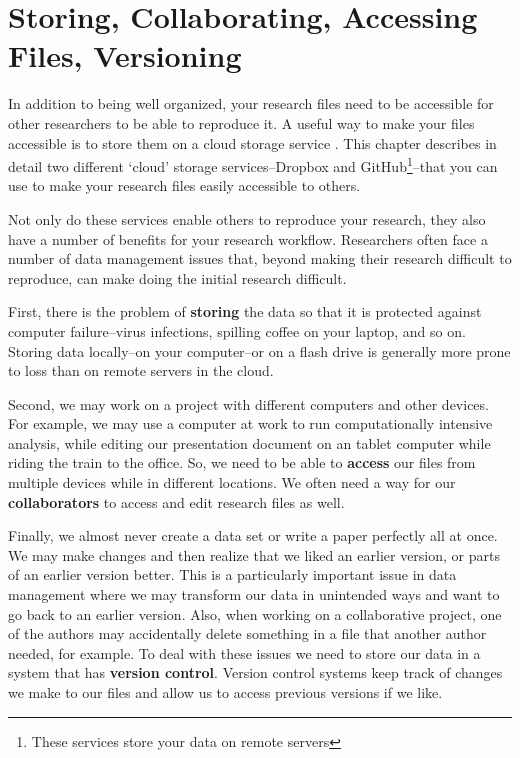 



\chapter{Storing, Collaborating, Accessing Files, Versioning}\label{Storing}

In addition to being well organized, your research files need to be accessible for other researchers to be able to reproduce it. A useful way to make your files accessible is to store them on a cloud storage service \cite[see][]{Howe2012}. This chapter describes in detail two different `cloud' storage services--Dropbox and GitHub\footnote{These services store your data on remote servers}--that you can use to make your research files easily accessible to others.

Not only do these services enable others to reproduce your research, they also have a number of benefits for your research workflow. Researchers often face a number of data management issues that, beyond making their research difficult to reproduce, can make doing the initial research difficult.

First, there is the problem of \textbf{storing} the data so that it is protected against computer failure--virus infections, spilling coffee on your laptop, and so on. Storing data locally--on your computer--or on a flash drive is generally more prone to loss than on remote servers in the cloud.

Second, we may work on a project with different computers and other devices. For example, we may use a computer at work to run computationally intensive analysis, while editing our presentation document on an tablet computer while riding the train to the office. So, we need to be able to \textbf{access} our files from multiple devices while in different locations. We often need a way for our \textbf{collaborators} to access and edit research files as well.

Finally, we almost never create a data set or write a paper perfectly all at once. We may make changes and then realize that we liked an earlier version, or parts of an earlier version better. This is a particularly important issue in data management where we may transform our data in unintended ways and want to go back to an earlier version. Also, when working on a collaborative project, one of the authors may accidentally delete something in a file that another author needed, for example. To deal with these issues we need to store our data in a system that has \textbf{version control}. Version control systems keep track of changes we make to our files and allow us to access previous versions if we
like.

